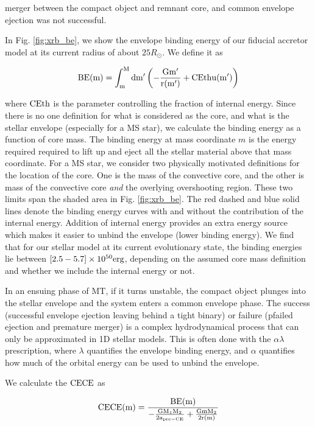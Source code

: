 \documentclass[linenumbers,trackchanges,twocolumn]{aastex701}
\begin{document}
merger between the compact object and remnant core, and common envelope ejection was not successful. 

In Fig. \ref{fig:xrb_be}, we show the envelope binding energy of our fiducial accretor model at its current radius of about $25R_{\odot}$. We define it as 

\begin{equation}
    \rm BE(m) = \int_m^M dm' \left(-\frac{Gm'}{r(m')} + \alpha_{\rm th}u(m')\right)
\end{equation}

where $\alpha_{\rm th}$ is the parameter controlling the fraction of internal energy. Since there is no one definition for what is considered as the core, and what is the stellar envelope (especially for a MS star), we calculate the binding energy as a function of core mass. The binding energy at mass coordinate $m$ is the energy required required to lift up and eject all the stellar material above that mass coordinate. For a MS star, we consider two physically motivated definitions for the location of the core. One is the mass of the convective core, and the other is mass of the convective core \textit{and} the overlying overshooting region. These two limits span the shaded area in Fig. \ref{fig:xrb_be}. The red dashed and blue solid lines denote the binding energy curves with and without the contribution of the internal energy. Addition of internal energy provides an extra energy source which makes it easier to unbind the envelope (lower binding energy). We find that for our stellar model at its current evolutionary state, the binding energies lie between $[2.5-5.7] \times 10^{50} \rm erg$, depending on the assumed core mass definition and whether we include the internal energy or not. 

In an ensuing phase of MT, if it turns unstable, the compact object plunges into the stellar envelope and the system enters a common envelope phase. The success (successful envelope ejection leaving behind a tight binary) or failure (pfailed ejection and premature merger) is a complex hydrodynamical process that can only be approximated in 1D stellar models. This is often done with the $\alpha \lambda$ prescription, where $\lambda$ quantifies the envelope binding energy, and $\alpha$ quantifies how much of the orbital energy can be used to unbind the envelope. 

We calculate the $\alpha_{\rm CE}$ as

\begin{equation}
    \alpha_{\rm CE} \def \alpha_{\rm CE}(m) = \frac{\rm BE(m)}{-\frac{\rm GM_1 M_2}{2a_{\rm pre-CE}} + \frac{\rm Gm M_2}{2r(m)}}
\end{equation}
\end{document}
